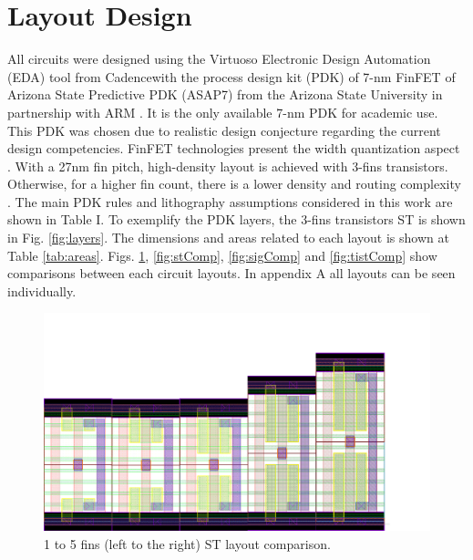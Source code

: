 \documentclass[pgmicro,mestrado,english]{iiufrgs}
\begin{document}
\section{Layout Design}

All circuits were designed using the Virtuoso Electronic Design Automation (EDA) tool from Cadence\textregistered with the process design kit (PDK) of 7-nm FinFET of Arizona State Predictive PDK (ASAP7) from the Arizona State University in partnership with ARM \cite{clark2016asap7}. It is the only available 7-nm PDK for academic use. This PDK was chosen due to realistic design conjecture regarding the current design competencies. FinFET technologies present the width quantization aspect \cite{2000Simulations}. With a 27nm fin pitch, high-density layout is achieved with 3-fins transistors. Otherwise, for a higher fin count, there is a lower density and routing complexity \cite{chava2015standard}. The main PDK rules and lithography assumptions considered in this work are shown in Table I. To exemplify the PDK layers, the 3-fins transistors ST is shown in Fig. \ref{fig:layers}. The dimensions and areas related to each layout is shown at Table \ref{tab:areas}. Figs. \ref{fig:invComp}, \ref{fig:stComp}, \ref{fig:sigComp} and \ref{fig:tistComp} show comparisons between each circuit layouts. In appendix A all layouts can be seen individually. %




\begin{figure}[H]
\centering
\includegraphics[width=\textwidth, trim={0cm 0cm 4cm 3cm},clip]{INVComp.pdf}
\caption{1 to 5 fins (left to the right) ST layout comparison.}
\label{fig:invComp}
\end{figure}
\end{document}
